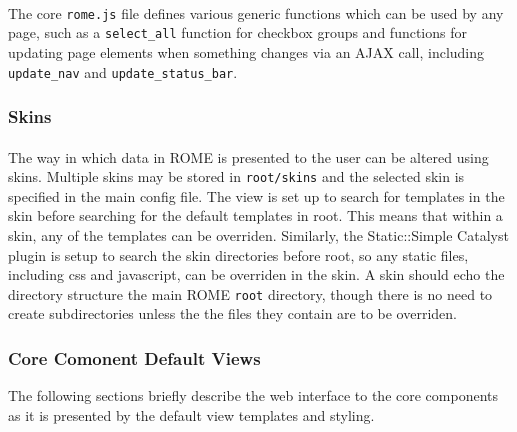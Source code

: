 \paragraph{}
The core \texttt{rome.js} file defines various generic functions which can be used by any page, such as a \texttt{select\_all} function for checkbox groups and functions for updating  page elements when something changes via an AJAX call, including \texttt{update\_nav} and \texttt{update\_status\_bar}.

\subsubsection{Skins}
\label{sec:view_skins}

\paragraph{}
The way in which data in ROME is presented to the user can be altered using skins. Multiple skins may be stored in \texttt{root/skins} and the selected skin is specified in the main config file. The view is set up to search for templates in the skin before searching for the default templates in root. This means that within a skin, any of the templates can be overriden. Similarly, the Static::Simple Catalyst plugin is setup to search the skin directories before root, so any static files, including css and javascript, can be overriden in the skin. A skin should echo the directory structure the main ROME \texttt{root} directory, though there is no need to create subdirectories unless the the files they contain are to be overriden. 


\subsubsection{Core Comonent Default Views}
The following sections briefly describe the web interface to the core components as it is presented by the default view templates and styling.



